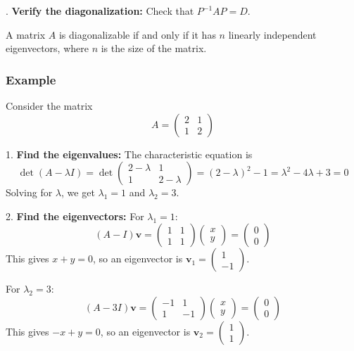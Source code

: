     .  \textbf{Verify the diagonalization:}
    Check that $P^{-1}AP = D$.

A matrix $A$ is diagonalizable if and only if it has $n$ linearly independent eigenvectors, where $n$ is the size of the matrix.

\subsubsection*{Example}

Consider the matrix
\[
A = \begin{pmatrix}
2 & 1 \\
1 & 2
\end{pmatrix}
\]

1.  \textbf{Find the eigenvalues:}
    The characteristic equation is
    \[
    \det(A - \lambda I) = \det \begin{pmatrix}
    2 - \lambda & 1 \\
    1 & 2 - \lambda
    \end{pmatrix} = (2 - \lambda)^2 - 1 = \lambda^2 - 4\lambda + 3 = 0
    \]
    Solving for $\lambda$, we get $\lambda_1 = 1$ and $\lambda_2 = 3$.

2.  \textbf{Find the eigenvectors:}
    For $\lambda_1 = 1$:
    \[
    (A - I)\mathbf{v} = \begin{pmatrix}
    1 & 1 \\
    1 & 1
    \end{pmatrix} \begin{pmatrix}
    x \\
    y
    \end{pmatrix} = \begin{pmatrix}
    0 \\
    0
    \end{pmatrix}
    \]
    This gives $x + y = 0$, so an eigenvector is $\mathbf{v}_1 = \begin{pmatrix} 1 \\ -1 \end{pmatrix}$.

    For $\lambda_2 = 3$:
    \[
    (A - 3I)\mathbf{v} = \begin{pmatrix}
    -1 & 1 \\
    1 & -1
    \end{pmatrix} \begin{pmatrix}
    x \\
    y
    \end{pmatrix} = \begin{pmatrix}
    0 \\
    0
    \end{pmatrix}
    \]
    This gives $-x + y = 0$, so an eigenvector is $\mathbf{v}_2 = \begin{pmatrix} 1 \\ 1 \end{pmatrix}$.

